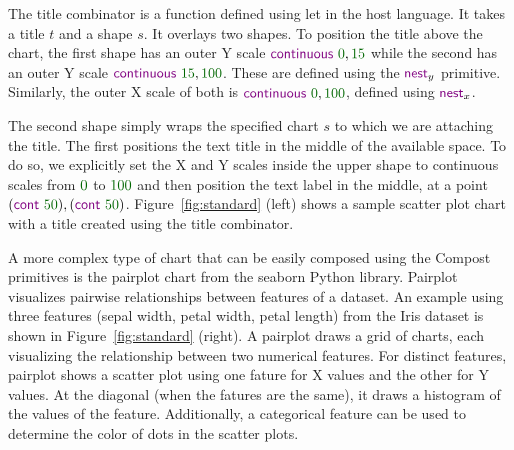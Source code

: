 \documentclass{jfp}
\newcommand{\num}[1]{\textcolor{numclr}{#1}}
\newcommand{\ident}[1]{\textnormal{\textcolor{idclr}{\sffamily #1}}}
\newcommand{\kvd}[1]{\textnormal{\textcolor{kvdclr}{\sffamily #1}}}
\newcommand{\fkvd}[1]{\textnormal{\textcolor{fkvdclr}{\sffamily #1}}}
\begin{document}
\vspace{-0.5em}
\noindent
The \ident{title} combinator is a function defined using \fkvd{let} in the host language. It takes
a title $t$ and a shape $s$. It overlays two shapes. To position the title above the chart, the first
shape has an outer Y scale $\kvd{continuous}~\num{0},\num{15}$ while the second has an outer Y scale
$\kvd{continuous}~\num{15},\num{100}$. These are defined using the $\kvd{nest}_y$ primitive. Similarly,
the outer X scale of both is $\kvd{continuous}~\num{0},\num{100}$, defined using $\kvd{nest}_x$.

The second shape simply wraps the specified chart $s$ to which we are attaching the title. The first
positions the text title in the middle of the available space. To do so, we explicitly set the X and
Y scales inside the upper shape to continuous scales from $\num{0}$ to $\num{100}$ and then position
the text label in the middle, at a point $(\kvd{cont}~\num{50}), (\kvd{cont}~\num{50})$.
Figure~\ref{fig:standard} (left) shows a sample scatter plot chart with a title created using the
\ident{title} combinator.

A more complex type of chart that can be easily composed using the Compost primitives is the
pairplot chart from the seaborn Python library. %
Pairplot visualizes pairwise relationships between features of a dataset.
An example using three features (sepal width, petal width, petal length) from the Iris dataset is shown
in Figure~\ref{fig:standard} (right). %
A pairplot draws a grid of charts, each visualizing the relationship between two numerical features. For distinct
features, pairplot shows a scatter plot using one fature for X values and the other for Y values.
At the diagonal (when the fatures are the same), it draws a histogram of the values of the feature.
Additionally, a categorical feature can be used to determine the color of dots in the scatter plots.
\end{document}
